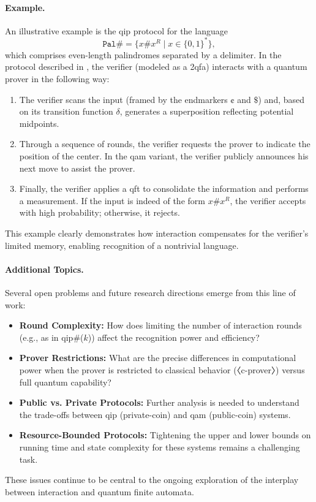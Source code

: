 \paragraph{Example.}
An illustrative example is the \gls{qip} protocol for the language
\[
\mathtt{Pal\#} = \{x\#x^R \mid x\in\{0,1\}^*\},
\]
which comprises even-length palindromes separated by a delimiter. In the protocol described in \cite{nishimura2015interactive}, the verifier (modeled as a 2qfa) interacts with a quantum prover in the following way:
\begin{enumerate}
  \item The verifier scans the input (framed by the endmarkers $\cent$ and $\$$) and, based on its transition function $\delta$, generates a superposition reflecting potential midpoints.
  \item Through a sequence of rounds, the verifier requests the prover to indicate the position of the center. In the \gls{qam} variant, the verifier publicly announces his next move to assist the prover.
  \item Finally, the verifier applies a \gls{qft} to consolidate the information and performs a measurement. If the input is indeed of the form $x\#x^R$, the verifier accepts with high probability; otherwise, it rejects.
\end{enumerate}
This example clearly demonstrates how interaction compensates for the verifier's limited memory, enabling recognition of a nontrivial language.

\paragraph{Additional Topics.}
Several open problems and future research directions emerge from this line of work:
\begin{itemize}
  \item \textbf{Round Complexity:} How does limiting the number of interaction rounds (e.g., as in \gls{qip}\#($k$)) affect the recognition power and efficiency?
  \item \textbf{Prover Restrictions:} What are the precise differences in computational power when the prover is restricted to classical behavior (〈c-prover〉) versus full quantum capability?
  \item \textbf{Public vs. Private Protocols:} Further analysis is needed to understand the trade-offs between \gls{qip} (private-coin) and \gls{qam} (public-coin) systems.
  \item \textbf{Resource-Bounded Protocols:} Tightening the upper and lower bounds on running time and state complexity for these systems remains a challenging task.
\end{itemize}
These issues continue to be central to the ongoing exploration of the interplay between interaction and quantum finite automata.

